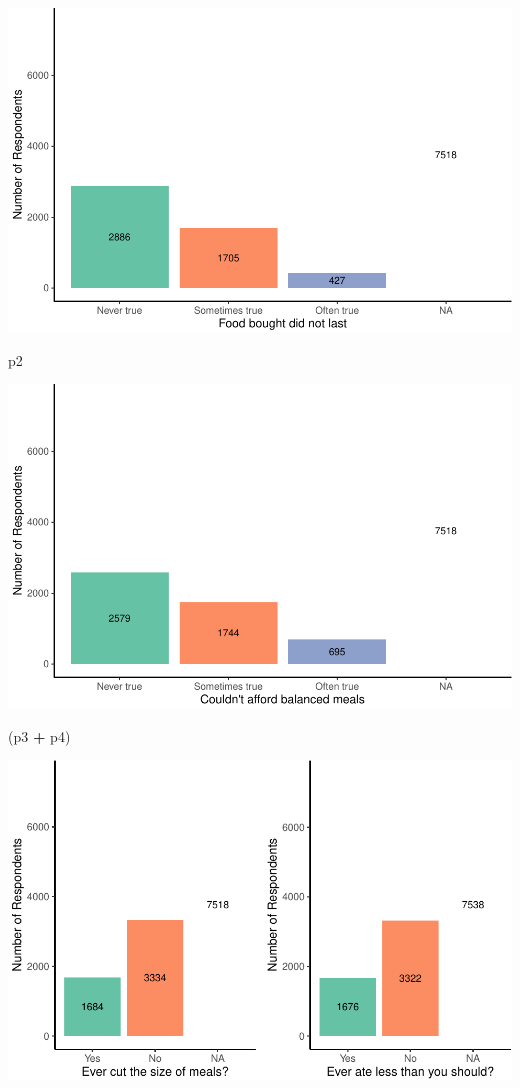 \documentclass[
  10pt,
]{article}
\newenvironment{Shaded}{\begin{snugshade}}{\end{snugshade}}
\newcommand{\NormalTok}[1]{#1}
\newcommand{\OperatorTok}[1]{\textcolor[rgb]{0.81,0.36,0.00}{\textbf{#1}}}
\newcommand{\StringTok}[1]{\textcolor[rgb]{0.31,0.60,0.02}{#1}}
\begin{document}
\includegraphics{phase1_report_files/figure-latex/unnamed-chunk-3-1}

\begin{Shaded}
\begin{Highlighting}[]
\NormalTok{p2 }
\end{Highlighting}
\end{Shaded}

\includegraphics{phase1_report_files/figure-latex/unnamed-chunk-3-2}

\begin{Shaded}
\begin{Highlighting}[]
\NormalTok{(p3 }\OperatorTok{+}\StringTok{ }\NormalTok{p4)}
\end{Highlighting}
\end{Shaded}

\includegraphics{phase1_report_files/figure-latex/unnamed-chunk-3-3}
\end{document}

